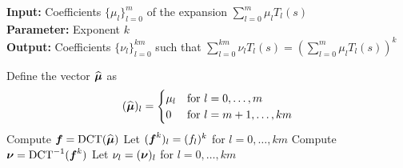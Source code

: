 \hspace*{\algorithmicindent} \textbf{Input:} Coefficients $\{ \mu_l \}_{l=0}^{m}$ of the expansion $\sum_{l=0}^{m} \mu_l T_l(s)$ \\
\hspace*{\algorithmicindent} \textbf{Parameter:} Exponent $k$ \\
\hspace*{\algorithmicindent} \textbf{Output:} Coefficients $\{ \nu_l \}_{l=0}^{km}$ such that $\sum_{l=0}^{km} \nu_l T_l(s) = (\sum_{l=0}^{m} \mu_l T_l(s))^k$
\begin{algorithmic}[1]
    \State Define the vector $\widehat{\boldsymbol{\mu}}$ as
        \begin{equation}
            (\widehat{\boldsymbol{\mu}})_l = \begin{cases} \mu_l &\text{for $l=0, \dots, m$} \\
                                                     0 &\text{for $l=m+1, \dots, km$} \end{cases}
        \end{equation}
    \State Compute $\boldsymbol{f} = \operatorname{DCT}(\widehat{\boldsymbol{\mu}})$
    \State Let $(\boldsymbol{f}^{k})_l = (f_l)^k$ for $l=0, \dots, km$
    \State Compute $\boldsymbol{\nu} = \operatorname{DCT}^{-1}(\boldsymbol{f}^{k})$
    \State Let $\nu_l = (\boldsymbol{\nu})_l$ for $l=0, \dots, km$
\end{algorithmic}
